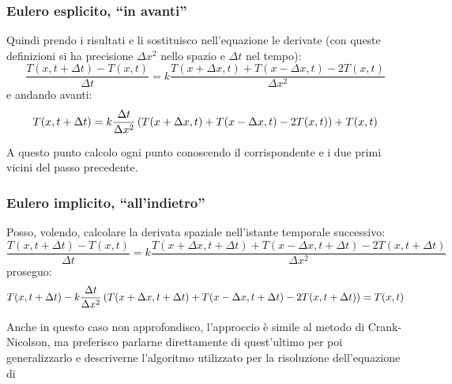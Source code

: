 \subsubsection{Eulero esplicito, ``in avanti''}
Quindi prendo i risultati e li sostituisco nell'equazione le derivate (con queste definizioni si ha precisione $\Delta x^2$ nello spazio e $\Delta t$ nel tempo):
\begin{equation}
  \frac{T(x,t+\Delta t)-T(x,t)}{\Delta t} = k \frac{T(x+\Delta x,t)+T(x-\Delta x,t)-2T(x,t)}{\Delta x^2}
\end{equation}
e andando avanti:
\begin{equation}
  T(x,t+\Delta t) = k\frac{\Delta t}{\Delta x^2} \left( T(x+\Delta x,t)+T(x-\Delta x,t)-2T(x,t) \right) + T(x,t)
\end{equation}

A questo punto calcolo ogni punto conoscendo il corrispondente e i due primi vicini del passo precedente.
\subsubsection{Eulero implicito, ``all'indietro''}
Posso, volendo, calcolare la derivata spaziale nell'istante temporale successivo:
\begin{equation}
  \frac{T(x,t+\Delta t)-T(x,t)}{\Delta t} = k \frac{T(x+\Delta x,t+\Delta t)+T(x-\Delta x,t+\Delta t)-2T(x,t+\Delta t)}{\Delta x^2}
\end{equation}
proseguo:
\begin{equation}
  T(x,t+\Delta t)- k \frac{\Delta t}{\Delta x^2}\left( T(x+\Delta x,t+\Delta t)+T(x-\Delta x,t+\Delta t)-2T(x,t+\Delta t) \right) = T(x,t)
\end{equation}

Anche in questo caso non approfondisco, l'approccio \`e simile al metodo di Crank-Nicolson, ma preferisco parlarne direttamente di quest'ultimo per poi generalizzarlo e descriverne l'algoritmo utilizzato per la risoluzione dell'equazione di \Schrodinger

